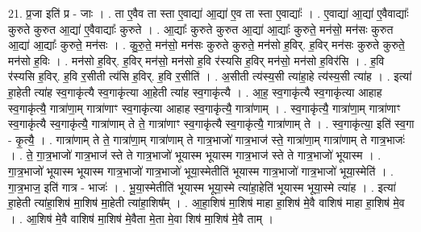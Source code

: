 \documentclass[17pt]{extarticle}
\begin{document}
21. प्र॒जा इति॑ प्र - जाः । . ता ए॒वैव ता स्ता ए॒वाद्या॑ आ॒द्या॑ ए॒व ता स्ता ए॒वाद्याः᳚ । . ए॒वाद्या॑ आ॒द्या॑ ए॒वैवाद्याः᳚ कुरुते कुरुत आ॒द्या॑ ए॒वैवाद्याः᳚ कुरुते । . आ॒द्याः᳚ कुरुते कुरुत आ॒द्या॑ आ॒द्याः᳚ कुरुते॒ मन॑सो॒ मन॑सः कुरुत आ॒द्या॑ आ॒द्याः᳚ कुरुते॒ मन॑सः । . कु॒रु॒ते॒ मन॑सो॒ मन॑सः कुरुते कुरुते॒ मन॑सो ह॒विर्. ह॒विर् मन॑सः कुरुते कुरुते॒ मन॑सो ह॒विः । . मन॑सो ह॒विर्. ह॒विर् मन॑सो॒ मन॑सो ह॒वि र॑स्यसि ह॒विर् मन॑सो॒ मन॑सो ह॒विर॑सि । . ह॒वि र॑स्यसि ह॒विर्. ह॒वि र॒सीती त्य॑सि ह॒विर्. ह॒वि र॒सीति॑ । . अ॒सीती त्य॑स्य॒सी त्या॑हा॒हे त्य॑स्य॒सी त्या॑ह । . इत्या॑ हा॒हेती त्या॑ह स्व॒गाकृ॑त्यै स्व॒गाकृ॑त्या आ॒हेती त्या॑ह स्व॒गाकृ॑त्यै । . आ॒ह॒ स्व॒गाकृ॑त्यै स्व॒गाकृ॑त्या आहाह स्व॒गाकृ॑त्यै॒ गात्रा॑णा॒म् गात्रा॑णाꣳ स्व॒गाकृ॑त्या आहाह स्व॒गाकृ॑त्यै॒ गात्रा॑णाम् । . स्व॒गाकृ॑त्यै॒ गात्रा॑णा॒म् गात्रा॑णाꣳ स्व॒गाकृ॑त्यै स्व॒गाकृ॑त्यै॒ गात्रा॑णाम् ते ते॒ गात्रा॑णाꣳ स्व॒गाकृ॑त्यै स्व॒गाकृ॑त्यै॒ गात्रा॑णाम् ते । . स्व॒गाकृ॑त्या॒ इति॑ स्व॒गा - कृ॒त्यै॒ । . गात्रा॑णाम् ते ते॒ गात्रा॑णा॒म् गात्रा॑णाम् ते गात्र॒भाजो॑ गात्र॒भाज॑ स्ते॒ गात्रा॑णा॒म् गात्रा॑णाम् ते गात्र॒भाजः॑ । . ते॒ गा॒त्र॒भाजो॑ गात्र॒भाज॑ स्ते ते गात्र॒भाजो॑ भूयास्म भूयास्म गात्र॒भाज॑ स्ते ते गात्र॒भाजो॑ भूयास्म । . गा॒त्र॒भाजो॑ भूयास्म भूयास्म गात्र॒भाजो॑ गात्र॒भाजो॑ भूया॒स्मेतीति॑ भूयास्म गात्र॒भाजो॑ गात्र॒भाजो॑ भूया॒स्मेति॑ । . गा॒त्र॒भाज॒ इति॑ गात्र - भाजः॑ । . भू॒या॒स्मेतीति॑ भूयास्म भूया॒स्मे त्या॑हा॒हेति॑ भूयास्म भूया॒स्मे त्या॑ह । . इत्या॑ हा॒हेती त्या॑हा॒शिष॑ मा॒शिष॑ मा॒हेती त्या॑हा॒शिष᳚म् । . आ॒हा॒शिष॑ मा॒शिष॑ माहा हा॒शिष॑ मे॒वै वाशिष॑ माहा हा॒शिष॑ मे॒व । . आ॒शिष॑ मे॒वै वाशिष॑ मा॒शिष॑ मे॒वैता मे॒ता मे॒वा शिष॑ मा॒शिष॑ मे॒वै ताम् । \newline
\end{document}
